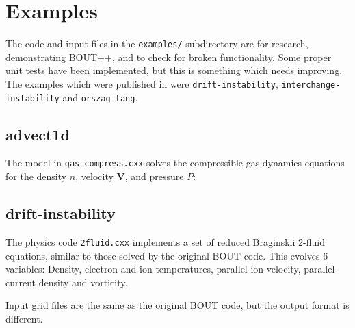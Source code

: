 \documentclass[12pt]{article}
\begin{document}
\section{Examples}
%
\label{sec:examples}
%
The code and input files in the \texttt{examples/} subdirectory are for
research, demonstrating BOUT++, and to check for broken functionality. Some
proper unit tests have been implemented, but this is something which needs
improving. The examples which were published in
\cite{Dudson2009,dudson-2008-arxiv} were \texttt{drift-instability},
\texttt{interchange-instability} and \texttt{orszag-tang}.



\subsection{advect1d}
%
The model in \texttt{gas\_compress.cxx} solves the compressible gas dynamics
equations for the density $n$, velocity $\mathbf{V}$, and pressure $P$:



\subsection{drift-instability}
%
The physics code \texttt{2fluid.cxx} implements a set of reduced Braginskii
2-fluid equations, similar to those solved by the original BOUT code.  This
evolves 6 variables: Density, electron and ion temperatures, parallel ion
velocity, parallel current density and vorticity.

Input grid files are the same as the original BOUT code, but the output format
is different.
\end{document}
